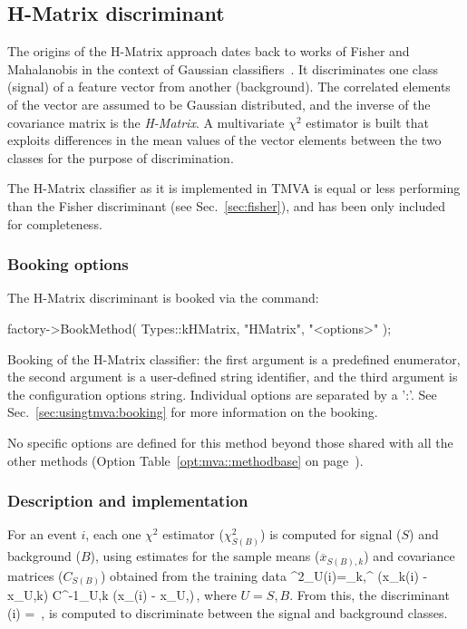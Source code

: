 \subsection{H-Matrix discriminant}
\label{sec:hmatrix}

The origins of the H-Matrix approach dates back to works 
of Fisher and Mahalanobis in the context of Gaussian 
classifiers~\cite{Fisher,Mahalanobis}. 
It discriminates one class (signal) of a feature vector from another 
(background). The correlated elements of the vector are assumed to be 
Gaussian distributed, and the inverse of the covariance matrix is 
the {\em H-Matrix}. A multivariate $\chi^2$ estimator 
is built that exploits differences in the mean values of the vector elements 
between the two classes for the purpose of discrimination.

The H-Matrix classifier as it is implemented in TMVA is equal or less performing
than the Fisher discriminant (see Sec.~\ref{sec:fisher}), and has been only  
included for completeness. 

\subsubsection{Booking options}

The H-Matrix discriminant is booked via the command:
\begin{codeexample}
\begin{tmvacode}
factory->BookMethod( Types::kHMatrix, "HMatrix", "<options>" );
\end{tmvacode}
\caption[.]{\codeexampleCaptionSize Booking of the H-Matrix classifier: the first argument is 
		   a predefined enumerator, the second argument is a user-defined 
		   string identifier, and the third argument is the configuration options string.
         Individual options are separated by a ':'. 
         See Sec.~\ref{sec:usingtmva:booking} for more information on the booking.}
\end{codeexample}

No specific options are defined for this method beyond those shared with all the other 
methods (\cf Option Table~\ref{opt:mva::methodbase} on page~\pageref{opt:mva::methodbase}).

\subsubsection{Description and implementation}

For an event $i$, each one $\chi^2$ estimator ($\chi^2_{S(B)}$) is computed for 
signal ($S$) and background ($B$), using estimates for the sample means 
($\overline x_{S(B),k}$) and covariance matrices ($C_{S(B)}$) obtained 
from the training data
\beq
  \chi^2_U(i)=\sum_{k,}^{\Nvar}
            \left(x_k(i) - \overline x_{U,k}\right)
            C^{-1}_{U,k\ell}
            \left(x_\ell(i) - \overline x_{U,\ell}\right)\,,
\eeq
where $U=S,B$. From this, the discriminant
\beq
   \HMATRIX(i) = \,,
\eeq
is computed to discriminate between the signal and background classes.

